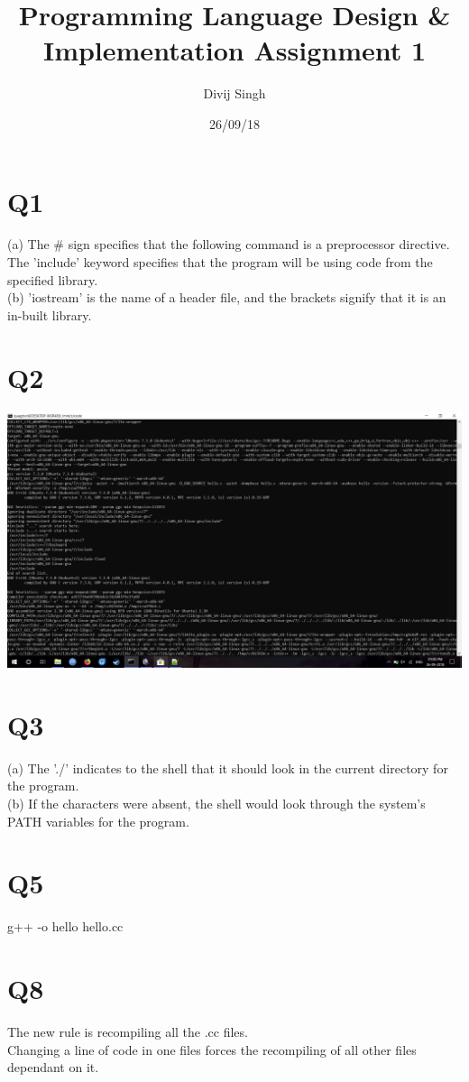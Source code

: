 \documentclass{article}
\title{Programming Language Design \& Implementation Assignment 1}
\author{Divij Singh}
\date{26/09/18}
\begin{document}
	\maketitle
	
	\section{Q1}
	(a) The \#  sign specifies that the following command is a preprocessor directive. The 'include' keyword specifies that the program will be using code from the specified library.\\
	(b) 'iostream' is the name of a header file, and the brackets signify that it is an in-built library.\\
\section{Q2}
\includegraphics[scale=0.5]{verbose.png}
\section{Q3}
(a) The './' indicates to the shell that it should look in the current directory for the program.\\
(b) If the characters were absent, the shell would look through the system's PATH variables for the program.

\section{Q5}
g++ -o hello hello.cc

\section{Q8}
The new rule is recompiling all the .cc files.\\
Changing a line of code in one files forces the recompiling of all other files dependant on it.


	
\end{document}
